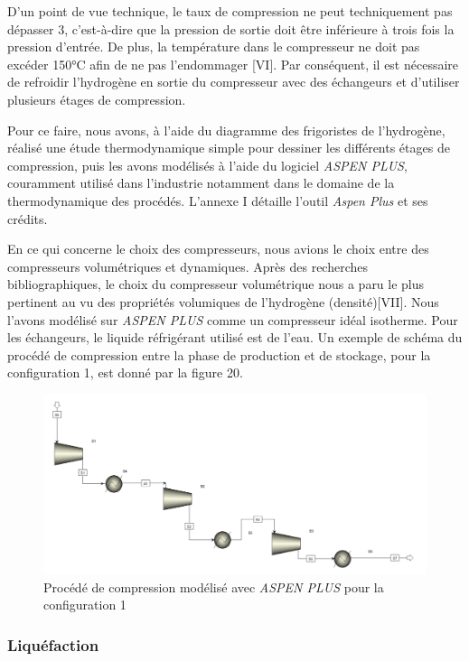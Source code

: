 \documentclass[11pt,french,a4paper]{article}
\begin{document}
D'un point de vue technique, le taux de compression ne peut techniquement pas dépasser 3, c'est-à-dire que la pression de sortie doit être inférieure à trois fois la pression d'entrée. De plus, la température dans le compresseur ne doit pas excéder 150°C afin de ne pas l'endommager [VI]. Par conséquent, il est nécessaire de refroidir l'hydrogène en sortie du compresseur avec des échangeurs et d'utiliser plusieurs étages de compression. 

Pour ce faire, nous avons, à l’aide du diagramme des frigoristes de l’hydrogène, réalisé une étude thermodynamique simple pour dessiner les différents étages de compression, puis les avons modélisés à l’aide du logiciel \emph{ASPEN PLUS}, couramment utilisé dans l'industrie notamment dans le domaine de la thermodynamique des procédés. L'annexe I détaille l'outil \textit{Aspen Plus} et ses crédits.

En ce qui concerne le choix des compresseurs, nous avions le choix entre des compresseurs volumétriques et dynamiques. Après des recherches bibliographiques, le choix du compresseur volumétrique nous a paru le plus pertinent au vu des propriétés volumiques de l’hydrogène (densité)[VII]. Nous l’avons modélisé sur \emph{ASPEN PLUS} comme un compresseur idéal isotherme. Pour les échangeurs, le liquide réfrigérant utilisé est de l’eau. Un exemple de schéma du procédé de compression entre la phase de production et de stockage, pour la configuration 1, est donné par la figure 20.\\

\begin{figure}[h!]
 \centering
 \includegraphics[width=.8\linewidth]{image/chap3/etage_compression.PNG}
 \caption{Procédé de compression modélisé avec \textit{ASPEN PLUS} pour la configuration 1}
\end{figure}



\subsubsection{Liquéfaction}
\end{document}

